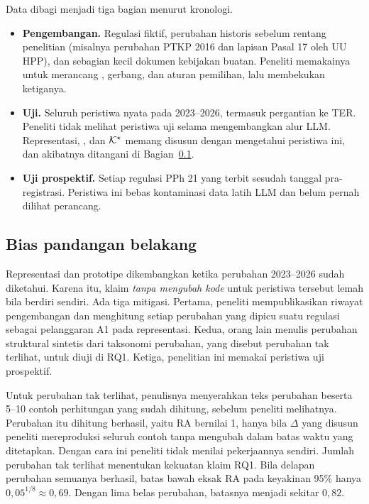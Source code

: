 Data dibagi menjadi tiga bagian menurut kronologi.
\begin{itemize}[leftmargin=*,nosep]
  \item \textbf{Pengembangan.} Regulasi fiktif, perubahan historis sebelum rentang penelitian (misalnya perubahan PTKP 2016 dan lapisan Pasal 17 oleh UU HPP), dan sebagian kecil dokumen kebijakan buatan. Peneliti memakainya untuk merancang , gerbang, dan aturan pemilihan, lalu membekukan ketiganya.
  \item \textbf{Uji.} Seluruh peristiwa nyata pada 2023--2026, termasuk pergantian ke TER. Peneliti tidak melihat peristiwa uji selama mengembangkan alur LLM. Representasi, , dan $\mathcal{K}^{\star}$ memang disusun dengan mengetahui peristiwa ini, dan akibatnya ditangani di Bagian~\ref{subsec:hindsight}.
  \item \textbf{Uji prospektif.} Setiap regulasi PPh 21 yang terbit sesudah tanggal pra-registrasi. Peristiwa ini bebas kontaminasi data latih LLM dan belum pernah dilihat perancang.
\end{itemize}

\subsection{Bias pandangan belakang}
\label{subsec:hindsight}

Representasi dan  prototipe dikembangkan ketika perubahan 2023--2026 sudah diketahui. Karena itu, klaim \emph{tanpa mengubah kode} untuk peristiwa tersebut lemah bila berdiri sendiri. Ada tiga mitigasi. Pertama, peneliti mempublikasikan riwayat pengembangan  dan menghitung setiap perubahan  yang dipicu suatu regulasi sebagai pelanggaran A1 pada representasi. Kedua, orang lain menulis perubahan struktural sintetis dari taksonomi perubahan, yang disebut perubahan tak terlihat, untuk diuji di RQ1. Ketiga, penelitian ini memakai peristiwa uji prospektif.

Untuk perubahan tak terlihat, penulisnya menyerahkan teks perubahan beserta 5--10 contoh perhitungan yang sudah dihitung, sebelum peneliti melihatnya. Perubahan itu dihitung berhasil, yaitu RA bernilai 1, hanya bila $\Delta$ yang disusun peneliti mereproduksi seluruh contoh tanpa mengubah  dalam batas waktu yang ditetapkan. Dengan cara ini peneliti tidak menilai pekerjaannya sendiri. Jumlah perubahan tak terlihat menentukan kekuatan klaim RQ1. Bila delapan perubahan semuanya berhasil, batas bawah eksak RA pada keyakinan 95\% hanya $0{,}05^{1/8} \approx 0{,}69$. Dengan lima belas perubahan, batasnya menjadi sekitar $0{,}82$.

